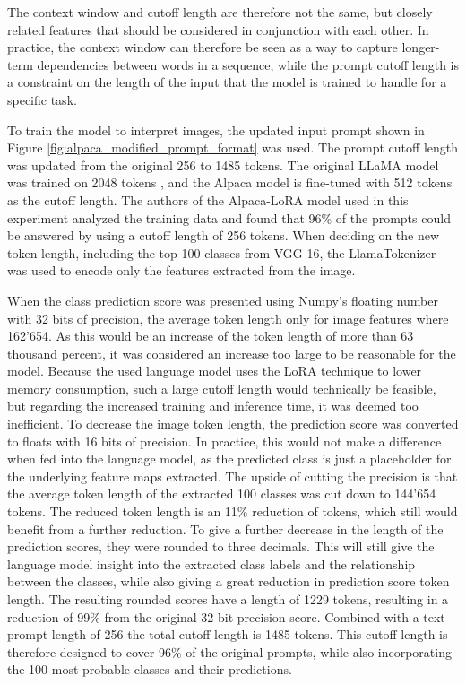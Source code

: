         The context window and cutoff length are therefore not the same, but closely related features that should be considered in conjunction with each other. In practice, the context window can therefore be seen as a way to capture longer-term dependencies between words in a sequence, while the prompt cutoff length is a constraint on the length of the input that the model is trained to handle for a specific task.
        
        

        To train the model to interpret images, the updated input prompt shown in Figure \ref{fig:alpaca_modified_prompt_format} was used. The prompt cutoff length was updated from the original 256 to 1485 tokens. The original LLaMA model was trained on 2048 tokens \cite{SequenceContextLength}, and the Alpaca model is fine-tuned with 512 tokens as the cutoff length. The authors of the Alpaca-LoRA model used in this experiment analyzed the training data and found that 96\% of the prompts could be answered by using a cutoff length of 256 tokens. When deciding on the new token length, including the top 100 classes from VGG-16, the LlamaTokenizer was used to encode only the features extracted from the image. 
        
        When the class prediction score was presented using Numpy's floating number with 32 bits of precision, the average token length only for image features where 162'654. As this would be an increase of the token length of more than 63 thousand percent, it was considered an increase too large to be reasonable for the model. Because the used language model uses the LoRA technique to lower memory consumption, such a large cutoff length would technically be feasible, but regarding the increased training and inference time, it was deemed too inefficient.  
        To decrease the image token length, the prediction score was converted to floats with 16 bits of precision. In practice, this would not make a difference when fed into the language model, as the predicted class is just a placeholder for the underlying feature maps extracted. The upside of cutting the precision is that the average token length of the extracted 100 classes was cut down to 144'654 tokens. The reduced token length is an 11\% reduction of tokens, which still would benefit from a further reduction. To give a further decrease in the length of the prediction scores, they were rounded to three decimals. This will still give the language model insight into the extracted class labels and the relationship between the classes, while also giving a great reduction in prediction score token length. The resulting rounded scores have a length of 1229 tokens, resulting in a reduction of 99\% from the original 32-bit precision score. Combined with a text prompt length of 256 the total cutoff length is 1485 tokens. This cutoff length is therefore designed to cover 96\% of the original prompts, while also incorporating the 100 most probable classes and their predictions. 


